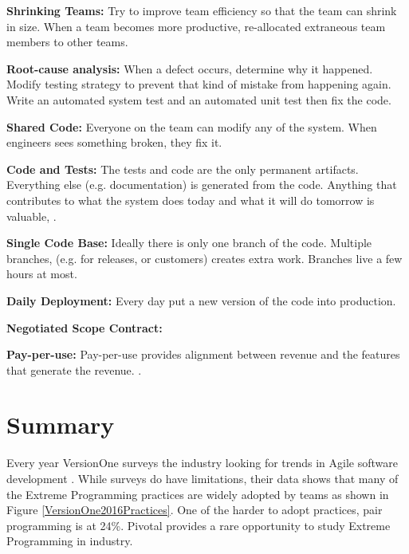 \textbf{Shrinking Teams:} Try to improve team efficiency so that the team can shrink in size. When a team becomes more productive, re-allocated extraneous team members to other teams.


\textbf{Root-cause analysis:} When a defect occurs, determine why it happened. Modify testing strategy to prevent that kind of mistake from happening again. Write an automated system test and an automated unit test then fix the code. 

\textbf{Shared Code:} Everyone on the team can modify any of the system. When engineers sees something broken, they fix it.

\textbf{Code and Tests:} The tests and code are the only permanent artifacts. Everything else (e.g. documentation) is generated from the code. Anything that contributes to what the system does today and what it will do tomorrow is valuable,  
\cite{BeckExtremeProgramming2004}.

\textbf{Single Code Base:} Ideally there is only one branch of the code. Multiple branches, (e.g. for releases, or customers) creates extra work. Branches live a few hours at most.

\textbf{Daily Deployment:} Every day put a new version of the code into production. 

\textbf{Negotiated Scope Contract:}  


\textbf{Pay-per-use:} Pay-per-use provides alignment between revenue and the features that generate the revenue.   \cite{BeckExtremeProgramming2004}.


\section{Summary}

Every year VersionOne surveys the industry looking for trends in Agile software development \cite{VersionOne2016Report}. While surveys do have limitations, their data shows that many of the Extreme Programming practices are widely adopted by teams as shown in Figure \ref{VersionOne2016Practices}. One of the harder to adopt practices, pair programming is at 24\%. Pivotal provides a rare opportunity to study Extreme Programming in industry.


